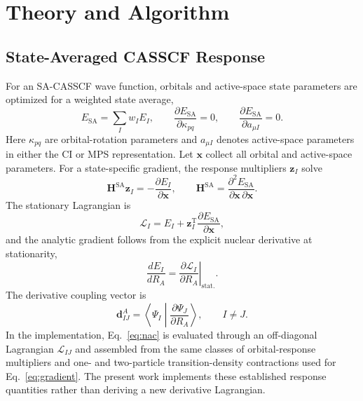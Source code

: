 \documentclass[journal=jctcce,manuscript=article]{achemso}
\newcommand{\bfx}{\mathbf{x}}
\newcommand{\bfz}{\mathbf{z}}
\newcommand{\bfH}{\mathbf{H}}
\begin{document}
\section{Theory and Algorithm}
\subsection{State-Averaged CASSCF Response}
For an SA-CASSCF wave function, orbitals and active-space state parameters are optimized for a weighted state average,
\begin{equation}
E_{\mathrm{SA}}=\sum_I w_I E_I,
\qquad
\frac{\partial E_{\mathrm{SA}}}{\partial \kappa_{pq}}=0,
\qquad
\frac{\partial E_{\mathrm{SA}}}{\partial a_{\mu I}}=0.
\end{equation}
Here $\kappa_{pq}$ are orbital-rotation parameters and $a_{\mu I}$ denotes active-space parameters in either the CI or MPS representation.
Let $\bfx$ collect all orbital and active-space parameters.
For a state-specific gradient, the response multipliers $\bfz_I$ solve
\begin{equation}
\label{eq:cp}
\bfH^{\mathrm{SA}}\bfz_I=-\frac{\partial E_I}{\partial\bfx},
\qquad
\bfH^{\mathrm{SA}}=\frac{\partial^2E_{\mathrm{SA}}}{\partial\bfx\,\partial\bfx}.
\end{equation}
The stationary Lagrangian is
\begin{equation}
\mathcal L_I=E_I+\bfz_I^{\mathrm T}\frac{\partial E_{\mathrm{SA}}}{\partial\bfx},
\end{equation}
and the analytic gradient follows from the explicit nuclear derivative at stationarity,
\begin{equation}
\label{eq:gradient}
\frac{dE_I}{dR_A}=\left.\frac{\partial\mathcal L_I}{\partial R_A}\right|_{\mathrm{stat.}}.
\end{equation}
The derivative coupling vector is
\begin{equation}
\label{eq:nac}
\mathbf d^A_{IJ}=\left\langle\Psi_I\middle|\frac{\partial\Psi_J}{\partial R_A}\right\rangle,
\qquad I\ne J.
\end{equation}
In the implementation, Eq.~\eqref{eq:nac} is evaluated through an off-diagonal Lagrangian $\mathcal L_{IJ}$ and assembled from the same classes of orbital-response multipliers and one- and two-particle transition-density contractions used for Eq.~\eqref{eq:gradient}.
The present work implements these established response quantities rather than deriving a new derivative Lagrangian.
\end{document}
